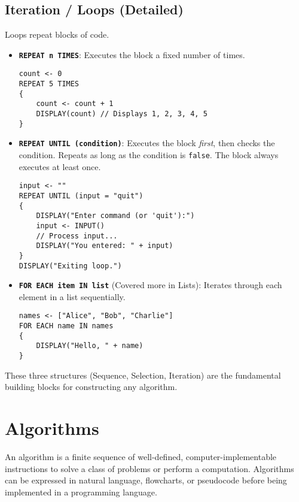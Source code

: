 \documentclass[11pt,oneside]{book}
\begin{document}
\subsection*{Iteration / Loops (Detailed)}
Loops repeat blocks of code.
\begin{itemize}
\item \textbf{\texttt{REPEAT n TIMES}}: Executes the block a fixed number of times.\\[1ex]
\begin{lstlisting}[language={}, label={lst:repeat_n_detail}, caption={AP Pseudocode: REPEAT n TIMES}]
count <- 0
REPEAT 5 TIMES
{
    count <- count + 1
    DISPLAY(count) // Displays 1, 2, 3, 4, 5
}
\end{lstlisting}
\item \textbf{\texttt{REPEAT UNTIL (condition)}}: Executes the block \textit{first}, then checks the condition. Repeats as long as the condition is \texttt{false}. The block always executes at least once.\\[1ex]
\begin{lstlisting}[language={}, label={lst:repeat_until_detail}, caption={AP Pseudocode: REPEAT UNTIL}]
input <- ""
REPEAT UNTIL (input = "quit")
{
    DISPLAY("Enter command (or 'quit'):")
    input <- INPUT()
    // Process input...
    DISPLAY("You entered: " + input)
}
DISPLAY("Exiting loop.")
\end{lstlisting}
\item \textbf{\texttt{FOR EACH item IN list}} (Covered more in Lists): Iterates through each element in a list sequentially.\\[1ex]
\begin{lstlisting}[language={}, label={lst:for_each_detail}, caption={AP Pseudocode: FOR EACH}]
names <- ["Alice", "Bob", "Charlie"]
FOR EACH name IN names
{
    DISPLAY("Hello, " + name)
}
\end{lstlisting}
\end{itemize}
These three structures (Sequence, Selection, Iteration) are the fundamental building blocks for constructing any algorithm.

\section{Algorithms}
\label{sec:algorithms}
An algorithm is a finite sequence of well-defined, computer-implementable instructions to solve a class of problems or perform a computation.
Algorithms can be expressed in natural language, flowcharts, or pseudocode before being implemented in a programming language.
\end{document}
